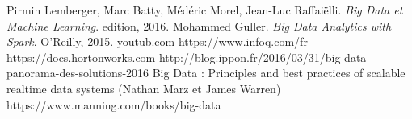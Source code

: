 


\begin{thebibliography}{ABC}	
     Pirmin Lemberger, Marc Batty, Médéric Morel, Jean-Luc Raffaiëlli. \emph{Big Data et Machine Learning}. edition, 2016.
     Mohammed Guller. \emph{Big Data Analytics with Spark}. O'Reilly, 2015.
      youtub.com
       https://www.infoq.com/fr
      https://docs.hortonworks.com 
       http://blog.ippon.fr/2016/03/31/big-data-panorama-des-solutions-2016
     Big Data : Principles and best practices of scalable realtime data systems
                                (Nathan Marz et James Warren) https://www.manning.com/books/big-data
\end{thebibliography}

